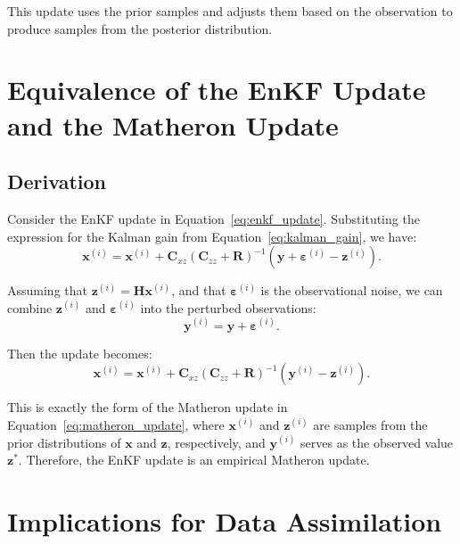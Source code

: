 \documentclass{article}
\theoremstyle{plain}
\begin{document}
This update uses the prior samples and adjusts them based on the observation to produce samples from the posterior distribution.

\section{Equivalence of the EnKF Update and the Matheron Update}

\subsection{Derivation}

Consider the EnKF update in Equation~\eqref{eq:enkf_update}. Substituting the expression for the Kalman gain from Equation~\eqref{eq:kalman_gain}, we have:
\begin{equation}
    \mathbf{x}^{(i)} = \mathbf{x}^{(i)} + \mathbf{C}_{xz} \left( \mathbf{C}_{zz} + \mathbf{R} \right)^{-1} \left( \mathbf{y} + \boldsymbol{\varepsilon}^{(i)} - \mathbf{z}^{(i)} \right).
    \label{eq:enkf_update_substituted}
\end{equation}

Assuming that $\mathbf{z}^{(i)} = \mathbf{H} \mathbf{x}^{(i)}$, and that $\boldsymbol{\varepsilon}^{(i)}$ is the observational noise, we can combine $\mathbf{z}^{(i)}$ and $\boldsymbol{\varepsilon}^{(i)}$ into the perturbed observations:
\begin{equation}
    \mathbf{y}^{(i)} = \mathbf{y} + \boldsymbol{\varepsilon}^{(i)}.
\end{equation}

Then the update becomes:
\begin{equation}
    \mathbf{x}^{(i)} = \mathbf{x}^{(i)} + \mathbf{C}_{xz} \left( \mathbf{C}_{zz} + \mathbf{R} \right)^{-1} \left( \mathbf{y}^{(i)} - \mathbf{z}^{(i)} \right).
    \label{eq:enkf_matheron}
\end{equation}

This is exactly the form of the Matheron update in Equation~\eqref{eq:matheron_update}, where $\mathbf{x}^{(i)}$ and $\mathbf{z}^{(i)}$ are samples from the prior distributions of $\mathbf{x}$ and $\mathbf{z}$, respectively, and $\mathbf{y}^{(i)}$ serves as the observed value $\mathbf{z}^*$. Therefore, the EnKF update is an empirical Matheron update.

\section{Implications for Data Assimilation}
\end{document}
